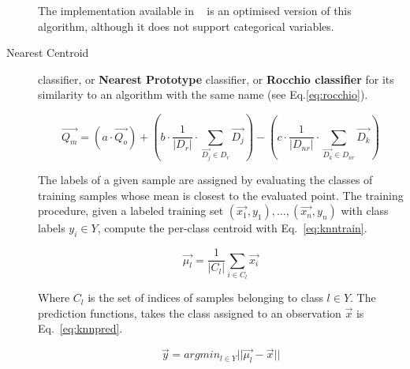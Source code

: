 \begin{description}
    The implementation available in ~\cite{scikit-learn} is an optimised 
    version of this algorithm, although it does not support categorical 
    variables.
    
    \item [Nearest Centroid] classifier\cite{conformal2014}, or \textbf{Nearest 
    Prototype} classifier, or \textbf{Rocchio classifier} for its similarity to 
    an algorithm with the same name (see Eq.\ref{eq:rocchio}). 
    
    \begin{equation}\label{eq:rocchio}
        \overrightarrow{Q_{m}} =  (a \cdot \overrightarrow{Q_{o}}) + (b \cdot 
        \frac{1}{\lvert D_{r} \rvert} \cdot \sum_{\overrightarrow{D_{j}} \in 
        D_{r}} \overrightarrow{D_{j}}) - (c \cdot \frac{1}{\lvert D_{nr} 
        \rvert} \cdot \sum_{\overrightarrow{D_{k}} \in D_{nr}} 
        \overrightarrow{D_{k}})
    \end{equation}
    
    The labels of a given sample are assigned by evaluating the classes of 
    training samples whose mean is closest to the evaluated point. The training 
    procedure, given a labeled training set ${(\overrightarrow{x_{1}}, y_{1}), 
    \ldots,  (\overrightarrow{x_{n}}, y_{n})}$ with class labels $y_{i} \in Y$, 
    compute the per-class centroid with Eq.~\ref{eq:knntrain}.
    
    \begin{equation}\label{eq:knntrain}
        \overrightarrow{\mu _{l}} = \frac{1}{\lvert C_{l} \rvert} \sum_{i \in 
        C_{l}} \overrightarrow{x_{i}}
    \end{equation}
    
    Where $C_{l}$ is the set of indices of samples belonging to class $l \in Y$.
    The prediction functions, takes the class assigned to an observation 
    $\overrightarrow{x}$ is Eq.~\ref{eq:knnpred}.
    
    \begin{equation}\label{eq:knnpred}
        \overrightarrow{y} = argmin_{l \in Y} \lvert\lvert \overrightarrow{
        \mu _{l}} - \overrightarrow{x} \rvert\rvert
    \end{equation}

\end{description}

%

